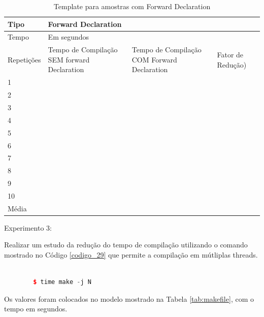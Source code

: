 \begin{table}[h]
\centering
\begin{tabular}{|l|p{3cm}|p{3cm}|p{3cm}|}
\hline
Tipo       & \multicolumn{3}{l|}{Forward Declaration}                                                                                                                            \\ \hline
Tempo      & \multicolumn{3}{l|}{Em segundos}                                                                                                                                    \\ \hline
Repetições & Tempo de Compilação SEM forward Declaration & Tempo de Compilação COM Forward Declaration & Fator de Redução) \\ \hline
1 &  &  &  \\ \hline
2 &  &  &  \\ \hline
3 &  &  &  \\ \hline
4 &  &  &  \\ \hline
5 &  &  &  \\ \hline
6 &  &  &  \\ \hline
7 &  &  &  \\ \hline
8 &  &  &  \\ \hline
9 &  &  &  \\ \hline
10 &  &  &  \\ \hline
Média &  &  &  \\ \hline
\end{tabular}
\caption{Template para amostras com Forward Declaration}
\label{tab:modelo_forward_declaration}
\end{table}



Experimento 3: \label{experimento_03}

Realizar um estudo da redução do tempo de compilação utilizando o comando
 mostrado no Código \ref{codigo_29} que permite a compilação em
 mútliplas threads.


\begin{lstlisting}[language=C++,frame=single,captionpos=b,caption={Execução programa 
								time mais programa make executando com threads},
                                                  			 label=codigo_29]

        $ time make -j N
\end{lstlisting}

Os valores foram colocados no modelo mostrado na Tabela \ref{tab:makefile},
 com o tempo em segundos.


